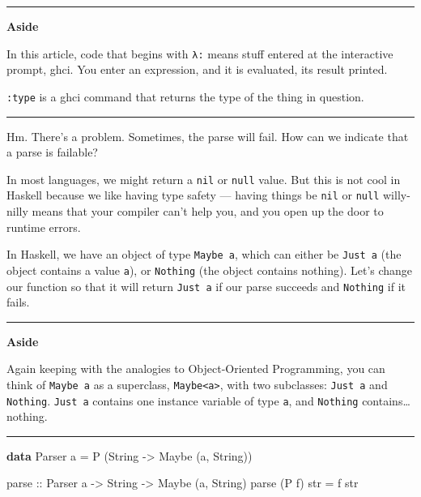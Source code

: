 \documentclass[]{article}
\newenvironment{Shaded}{}{}
\newcommand{\DataTypeTok}[1]{\textcolor[rgb]{0.56,0.13,0.00}{#1}}
\newcommand{\KeywordTok}[1]{\textcolor[rgb]{0.00,0.44,0.13}{\textbf{#1}}}
\newcommand{\NormalTok}[1]{#1}
\newcommand{\OtherTok}[1]{\textcolor[rgb]{0.00,0.44,0.13}{#1}}
\begin{document}
\begin{center}\rule{0.5\linewidth}{0.5pt}\end{center}

\textbf{Aside}

In this article, code that begins with \texttt{λ:} means stuff entered at the
interactive prompt, ghci. You enter an expression, and it is evaluated, its
result printed.

\texttt{:type} is a ghci command that returns the type of the thing in question.

\begin{center}\rule{0.5\linewidth}{0.5pt}\end{center}

Hm. There's a problem. Sometimes, the parse will fail. How can we indicate that
a parse is failable?

In most languages, we might return a \texttt{nil} or \texttt{null} value. But
this is not cool in Haskell because we like having type safety --- having things
be \texttt{nil} or \texttt{null} willy-nilly means that your compiler can't help
you, and you open up the door to runtime errors.

In Haskell, we have an object of type \texttt{Maybe\ a}, which can either be
\texttt{Just\ a} (the object contains a value \texttt{a}), or \texttt{Nothing}
(the object contains nothing). Let's change our function so that it will return
\texttt{Just\ a} if our parse succeeds and \texttt{Nothing} if it fails.

\begin{center}\rule{0.5\linewidth}{0.5pt}\end{center}

\textbf{Aside}

Again keeping with the analogies to Object-Oriented Programming, you can think
of \texttt{Maybe\ a} as a superclass, \texttt{Maybe\textless{}a\textgreater{}},
with two subclasses: \texttt{Just\ a} and \texttt{Nothing}. \texttt{Just\ a}
contains one instance variable of type \texttt{a}, and \texttt{Nothing}
contains\ldots nothing.

\begin{center}\rule{0.5\linewidth}{0.5pt}\end{center}

\begin{Shaded}
\begin{Highlighting}[]
\KeywordTok{data} \DataTypeTok{Parser}\NormalTok{ a }\OtherTok{=} \DataTypeTok{P}\NormalTok{ (}\DataTypeTok{String} \OtherTok{{-}\textgreater{}} \DataTypeTok{Maybe}\NormalTok{ (a, }\DataTypeTok{String}\NormalTok{))}

\OtherTok{parse ::} \DataTypeTok{Parser}\NormalTok{ a }\OtherTok{{-}\textgreater{}} \DataTypeTok{String} \OtherTok{{-}\textgreater{}} \DataTypeTok{Maybe}\NormalTok{ (a, }\DataTypeTok{String}\NormalTok{)}
\NormalTok{parse (}\DataTypeTok{P}\NormalTok{ f) str }\OtherTok{=}\NormalTok{ f str}
\end{Highlighting}
\end{Shaded}
\end{document}
